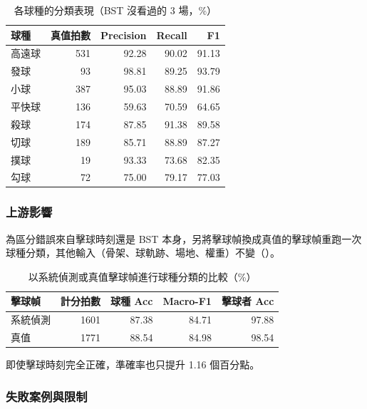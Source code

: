\begin{table}[htbp]
  \centering
  \small
  \caption{各球種的分類表現（BST 沒看過的 3 場，\%）}
  \label{tab:stroke-per-class}
  \begin{tabular}{|l|r|r|r|r|}
    \hline
    球種 & 真值拍數 & Precision & Recall & F1 \\ \hline
    高遠球 & 531 & 92.28 & 90.02 & 91.13 \\ \hline
    發球 & 93 & 98.81 & 89.25 & 93.79 \\ \hline
    小球 & 387 & 95.03 & 88.89 & 91.86 \\ \hline
    平快球 & 136 & 59.63 & 70.59 & 64.65 \\ \hline
    殺球 & 174 & 87.85 & 91.38 & 89.58 \\ \hline
    切球 & 189 & 85.71 & 88.89 & 87.27 \\ \hline
    撲球 & 19 & 93.33 & 73.68 & 82.35 \\ \hline
    勾球 & 72 & 75.00 & 79.17 & 77.03 \\ \hline
  \end{tabular}
\end{table}

\subsubsection{上游影響}

為區分錯誤來自擊球時刻還是 BST 本身，另將擊球幀換成真值的擊球幀重跑一次球種分類，其他輸入（骨架、球軌跡、場地、權重）不變（）。

\begin{table}[htbp]
  \centering
  \small
  \caption{以系統偵測或真值擊球幀進行球種分類的比較（\%）}
  \label{tab:stroke-upstream}
  \begin{tabular}{|l|r|r|r|r|}
    \hline
    擊球幀 & 計分拍數 & 球種 Acc & Macro-F1 & 擊球者 Acc \\ \hline
    系統偵測 & 1601 & 87.38 & 84.71 & 97.88 \\ \hline
    真值 & 1771 & 88.54 & 84.98 & 98.54 \\ \hline
  \end{tabular}
\end{table}

即使擊球時刻完全正確，準確率也只提升 1.16 個百分點。

\subsubsection{失敗案例與限制}

